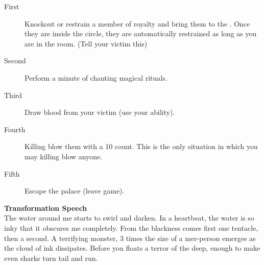 \documentclass[green]{NeptuneBall}
\begin{document}
\begin{description}
\item[First] Knockout or restrain a member of royalty and bring them to the \sRunicCircle{}. Once they are inside the circle, they are automatically restrained as long as you are in the room. (Tell your victim this)
\item[Second] Perform a minute of chanting magical rituals.
\item[Third] Draw blood from your victim (use your ability).
\item[Fourth] Killing blow them with a 10 count. This is the only situation in which you may killing blow anyone.
\item[Fifth] Escape the palace (leave game).
\end{description}

{\bf Transformation Speech}\\
The water around me starts to swirl and darken. In a heartbeat, the water is so inky that it obscures me completely. From the blackness comes first one tentacle, then a second. A terrifying monster, 3 times the size of a mer-person emerges as the cloud of ink dissipates. Before you floats a terror of the deep, enough to make even sharks turn tail and run.
\end{document}
